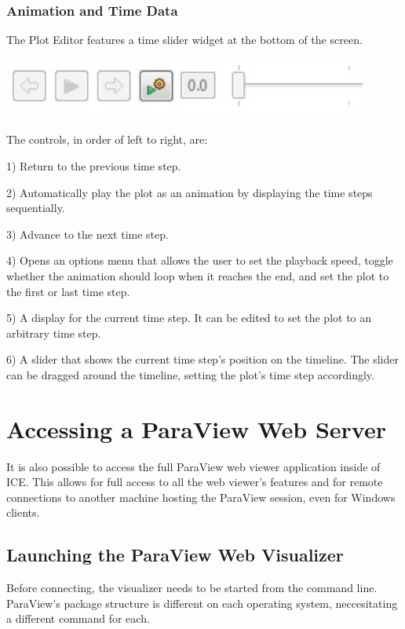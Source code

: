 \subsubsection{Animation and Time Data}

The Plot Editor features a time slider widget at the bottom of the screen. 

\begin{center}
\includegraphics[width=12cm]{images/TimeSliderWidget}
\end{center}

The controls, in order of left to right, are:

1) Return to the previous time step.

2) Automatically play the plot as an animation by displaying the time steps
sequentially. 

3) Advance to the next time step. 

4) Opens an options menu that allows the user to set the playback speed, toggle
whether the animation should loop when it reaches the end, and set the plot to
the first or last time step.

5) A display for the current time step. It can be edited to set the plot to an
arbitrary time step. 

6) A slider that shows the current time step's position on the timeline. The
slider can be dragged around the timeline, setting the plot's time step
accordingly.

\section{Accessing a ParaView Web Server}

It is also possible to access the full ParaView web viewer application inside of
ICE. This allows for full access to all the web viewer's features and for remote
connections to another machine hosting the ParaView session, even for Windows
clients.

\subsection{Launching the ParaView Web Visualizer}

Before connecting, the visualizer needs to be started from the command line.
ParaView's package structure is different on each operating system,
neccesitating a different command for each.

